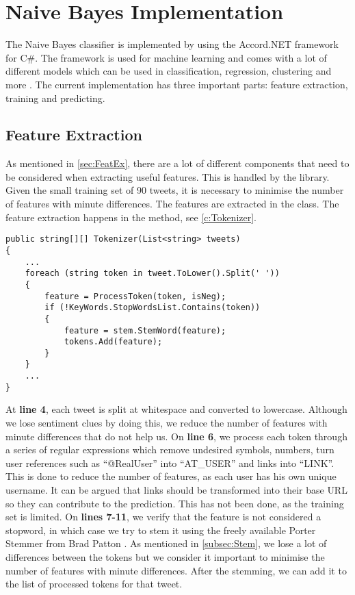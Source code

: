 \section{Naive Bayes Implementation}\label{sec:NBImp}

The Naive Bayes classifier is implemented by using the Accord.NET framework for
C\#. The framework is used for machine learning and comes with a lot of
different models which can be used in classification, regression, clustering and more
\citep{Accord}. The current implementation has three important parts: feature
extraction, training and predicting.

\subsection{Feature Extraction}
As mentioned in \autoref{sec:FeatEx}, there are a lot of different components
that need to be considered when extracting useful features. This is handled by
the  library.
Given the small training set of 90 tweets, it is necessary to minimise the
number of features with minute differences. The features are
extracted in the  class. The feature extraction
happens in the  method, see \autoref{c:Tokenizer}.\nl

\begin{minipage}[H]{\linewidth}
\begin{lstlisting}[caption = Split and process each token in a tweet with
regexes and stemming., label = c:Tokenizer] 
public string[][] Tokenizer(List<string> tweets)
{
    ...
    foreach (string token in tweet.ToLower().Split(' '))
    {
        feature = ProcessToken(token, isNeg);
        if (!KeyWords.StopWordsList.Contains(token))
        {
        	feature = stem.StemWord(feature);
	        tokens.Add(feature);
    	}
	}
	...
}
\end{lstlisting}
\end{minipage}

At \textbf{line 4}, each tweet is split at whitespace and converted to
lowercase. Although we lose sentiment clues by doing this, we reduce the number
of features with minute differences that do not help us. On \textbf{line 6}, we
process each token through a series of regular expressions which remove
undesired symbols, numbers, turn user references such as ``@RealUser'' into ``AT\_USER'' and links
into ``LINK''. This is done to reduce the number of features, as each user has
his own unique username. It can be argued that links should be transformed into
their base \ac{URL} so they can contribute to the prediction. This has not been
done, as the training set is limited. On \textbf{lines 7-11}, we verify that the
feature is not considered a stopword, in which case we try to stem it using the
freely available Porter Stemmer from Brad Patton \citep{PorterStem}. As
mentioned in \autoref{subsec:Stem}, we lose a lot of differences between the
tokens but we consider it important to minimise the number of features with
minute differences. After the stemming, we can add it to the list of processed
tokens for that tweet.

